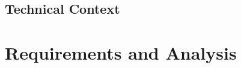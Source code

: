 \documentclass{report}
\begin{document}

\section{Technical Context}








\chapter{Requirements and Analysis}  %
\end{document}
